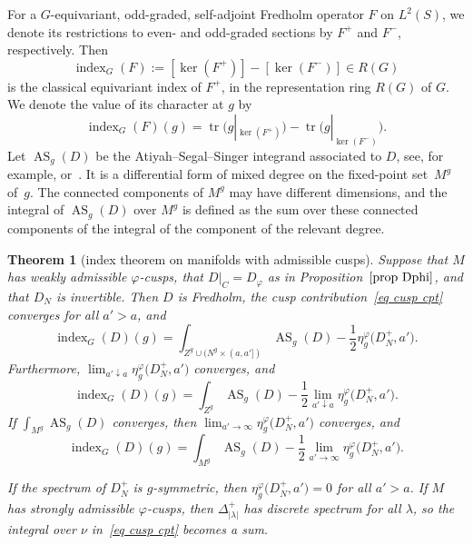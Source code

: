 \documentclass[pdftex]{sigma}%
\numberwithin{equation}{section}
\newtheorem{Theorem}{Theorem}[section]
\DeclareMathOperator{\tr}{tr}
\DeclareMathOperator{\AS}{AS}
\DeclareMathOperator{\ind}{index}
\begin{document}
For a $G$-equivariant, odd-graded, self-adjoint Fredholm operator $F$ on $L^2(S)$, we denote its restrictions to even- and odd-graded sections by $F^+$ and $F^-$, respectively. Then
\[
\ind_G(F) := [\ker(F^+)] - [\ker(F^-)] \in R(G)
\]
is the classical equivariant index of $F^+$, in the representation ring $R(G)$ of $G$. We denote the value of its character at $g$ by
\[
\ind_G(F)(g) = \tr\big(g|_{\ker(F^+)}\big) - \tr\big(g|_{\ker(F^-)}\big).
\]
Let $\AS_g(D)$ be the Atiyah--Segal--Singer integrand associated to $D$, see, for example, \cite[Theo\-rem~6.16]{BGV} or~\cite[Theo\-rem~3.9]{ASIII}. It is a differential form of mixed degree on the fixed-point set~$M^g$ of~$g$. The connected components of $M^g$ may have different dimensions, and the integral of $\AS_g(D)$ over $M^g$ is defined as the sum over these connected components of the integral of the component of the relevant degree.
\begin{Theorem}[index theorem on manifolds with admissible cusps]\label{thm index cusps}
Suppose that $M$ has weakly admissible $\varphi$-cusps, that $D|_C = D_{\varphi}$ as in Proposition~$\ref{prop Dphi}$, and that $D_N$ is invertible.
Then $D$ is Fredholm, the cusp contribution~\eqref{eq cusp cpt} converges for all $a'>a$, and
\begin{equation} \label{eq index cusps}
\ind_G(D)(g) = \int_{Z^g \cup (N^g \times (a,a'])} \AS_g(D) - \frac{1}{2}\eta_g^{\varphi}\big(D_N^+,a'\big).
\end{equation}
Furthermore, $\lim_{a' \downarrow a}\eta_g^{\varphi}\big(D_N^+,a'\big)$ converges, and
\begin{equation} \label{eq index cusps 2}
\ind_G(D)(g) = \int_{Z^g} \AS_g(D) - \frac{1}{2}\lim_{a' \downarrow a} \eta_g^{\varphi}\big(D_N^+,a'\big).
\end{equation}
If $\int_{M^g} \AS_g(D)$ converges, then $\lim_{a' \to \infty}\eta_g^{\varphi}\big(D_N^+,a'\big)$ converges, and
\begin{equation} \label{eq index cusps 3}
\ind_G(D)(g) = \int_{M^g} \AS_g(D) - \frac{1}{2}\lim_{a' \to \infty} \eta_g^{\varphi}\big(D_N^+,a'\big).
\end{equation}

If the spectrum of $D_N^+$ is $g$-symmetric, then $\eta_g^{\varphi}\big(D_N^+, a'\big) = 0$ for all $a'>a$.
If $M$ has strongly admissible $\varphi$-cusps, then $\Delta_{|\lambda|}^+$ has discrete spectrum for all $\lambda$, so the integral over $\nu$ in~\eqref{eq cusp cpt} becomes a sum.
\end{Theorem}
\end{document}
